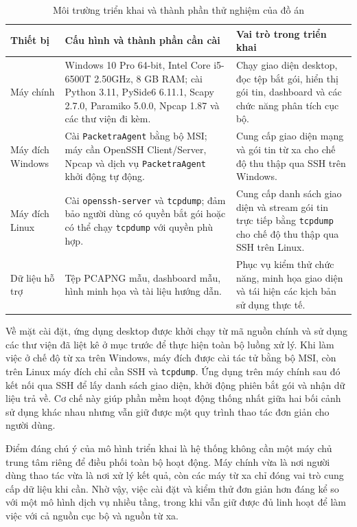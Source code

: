\documentclass[../DoAn.tex]{subfiles}
\begin{document}
\begin{table}[H]
\centering
\begin{tabular}{p{3.0cm}p{5.7cm}p{4.8cm}}
\hline
\textbf{Thiết bị} & \textbf{Cấu hình và thành phần cần cài} & \textbf{Vai trò trong triển khai} \\ \hline
Máy chính & Windows 10 Pro 64-bit, Intel Core i5-6500T 2.50GHz, 8 GB RAM; cài Python 3.11, PySide6 6.11.1, Scapy 2.7.0, Paramiko 5.0.0, Npcap 1.87 và các thư viện đi kèm. & Chạy giao diện desktop, đọc tệp bắt gói, hiển thị gói tin, dashboard và các chức năng phân tích cục bộ. \\ \hline
Máy đích Windows & Cài \texttt{PacketraAgent} bằng bộ MSI; máy cần OpenSSH Client/Server, Npcap và dịch vụ \texttt{PacketraAgent} khởi động tự động. & Cung cấp giao diện mạng và gói tin từ xa cho chế độ thu thập qua SSH trên Windows. \\ \hline
Máy đích Linux & Cài \texttt{openssh-server} và \texttt{tcpdump}; đảm bảo người dùng có quyền bắt gói hoặc có thể chạy \texttt{tcpdump} với quyền phù hợp. & Cung cấp danh sách giao diện và stream gói tin trực tiếp bằng \texttt{tcpdump} cho chế độ thu thập qua SSH trên Linux. \\ \hline
Dữ liệu hỗ trợ & Tệp PCAPNG mẫu, dashboard mẫu, hình minh họa và tài liệu hướng dẫn. & Phục vụ kiểm thử chức năng, minh họa giao diện và tái hiện các kịch bản sử dụng thực tế. \\ \hline
\end{tabular}
\caption{Môi trường triển khai và thành phần thử nghiệm của đồ án}
\label{tab:deployment_environment}
\end{table}

Về mặt cài đặt, ứng dụng desktop được khởi chạy từ mã nguồn chính và sử dụng các thư viện đã liệt kê ở mục trước để thực hiện toàn bộ luồng xử lý. Khi làm việc ở chế độ từ xa trên Windows, máy đích được cài tác tử bằng bộ MSI, còn trên Linux máy đích chỉ cần SSH và \texttt{tcpdump}. Ứng dụng trên máy chính sau đó kết nối qua SSH để lấy danh sách giao diện, khởi động phiên bắt gói và nhận dữ liệu trả về. Cơ chế này giúp phần mềm hoạt động thống nhất giữa hai bối cảnh sử dụng khác nhau nhưng vẫn giữ được một quy trình thao tác đơn giản cho người dùng.

Điểm đáng chú ý của mô hình triển khai là hệ thống không cần một máy chủ trung tâm riêng để điều phối toàn bộ hoạt động. Máy chính vừa là nơi người dùng thao tác vừa là nơi xử lý kết quả, còn các máy từ xa chỉ đóng vai trò cung cấp dữ liệu khi cần. Nhờ vậy, việc cài đặt và kiểm thử đơn giản hơn đáng kể so với một mô hình dịch vụ nhiều tầng, trong khi vẫn giữ được đủ linh hoạt để làm việc với cả nguồn cục bộ và nguồn từ xa.
\end{document}
